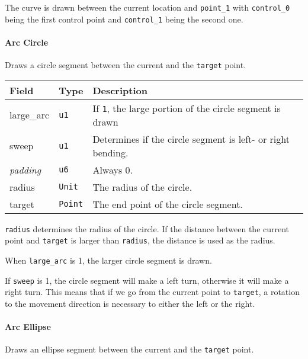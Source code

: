 \documentclass[]{article}
\begin{document}
The curve is drawn between the current location and \texttt{point\_1}
with \texttt{control\_0} being the first control point and
\texttt{control\_1} being the second one.

\hypertarget{arc-circle}{\paragraph{Arc Circle}\label{arc-circle}}

Draws a circle segment between the current and the \texttt{target}
point.

\begin{longtable}[]{@{}p{1in}p{0.5in}p{4.5in}@{}}
\toprule
Field & Type & Description \\
\midrule
\endhead
large\_arc & \texttt{u1} & If \texttt{1}, the large portion of the circle segment is drawn \\
sweep & \texttt{u1} & Determines if the circle segment is left- or right bending. \\
\emph{padding} & \texttt{u6} & Always 0. \\
radius & \texttt{Unit} & The radius of the circle. \\
target & \texttt{Point} & The end point of the circle segment. \\
\bottomrule
\end{longtable}

\texttt{radius} determines the radius of the circle. If the distance
between the current point and \texttt{target} is larger than
\texttt{radius}, the distance is used as the radius.

When \texttt{large\_arc} is 1, the larger circle segment is drawn.

If \texttt{sweep} is 1, the circle segment will make a left turn,
otherwise it will make a right turn. This means that if we go from the
current point to \texttt{target}, a rotation to the movement direction
is necessary to either the left or the right.

\hypertarget{arc-ellipse}{\paragraph{Arc Ellipse}\label{arc-ellipse}}

Draws an ellipse segment between the current and the \texttt{target}
point.
\end{document}

